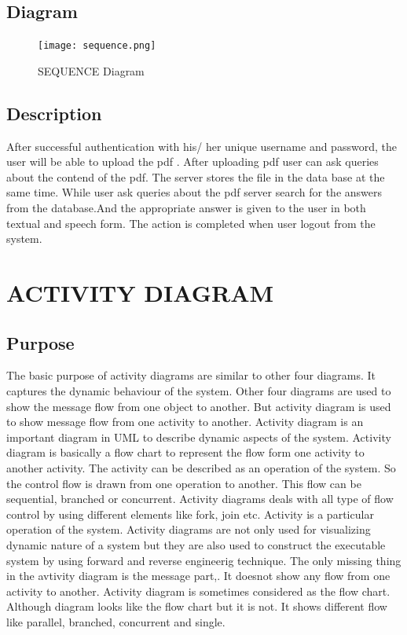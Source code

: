\documentclass[12pt,a4paper,oneside]{report}
\begin{document}
\subsection{Diagram}
\begin{figure}[h]
  	\begin{center}
  		\texttt{[image: sequence.png]}
  			\caption{SEQUENCE Diagram}
  			\label{SEQUENCE Diagram}
  	\end{center}
  \end{figure}
 \newpage
\subsection{Description}
After successful authentication with his/ her unique username and password, the user will
be able to upload the pdf . After uploading pdf user can ask queries about the contend of the pdf. The server stores the file in the data base at the same time. While user ask queries about the pdf server search for the answers from the database.And the appropriate answer is given to the user in both textual and speech form. The action is completed when
user logout from the system.

\section{ACTIVITY DIAGRAM}
\subsection{Purpose}
The basic purpose of activity diagrams are similar to other four diagrams. It captures the dynamic behaviour of the system. Other four diagrams are used to show the message flow from one object to another. But activity diagram is used to show message flow from one activity to another. Activity diagram is an important diagram in UML to describe dynamic aspects of the
system. Activity diagram is basically a flow chart to represent the flow form one activity to
another activity. The activity can be described as an operation of the system. So the control flow
is drawn from one operation to another. This flow can be sequential, branched or concurrent.
Activity diagrams deals with all type of flow control by using different elements like fork, join
etc. Activity is a particular operation of the system. Activity diagrams are not only used for visualizing dynamic nature of a system but they are also used to construct the executable system by using forward and reverse engineerig technique. The only missing thing in the avtivity diagram is the message part,. It doesnot show any flow from one activity to another. Activity diagram is sometimes considered as the flow chart. Although diagram looks like the flow chart but it is not. It shows different flow like parallel, branched, concurrent and single.\\
\newpage
\end{document}

